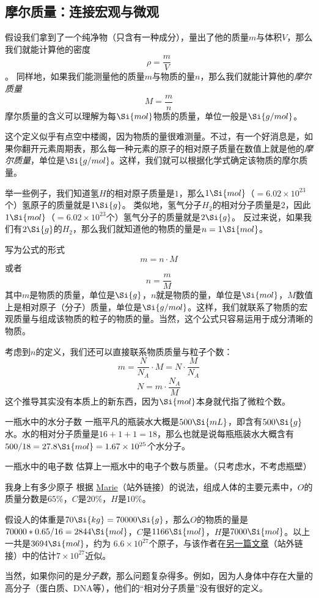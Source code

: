 \subsection{摩尔质量：连接宏观与微观}
假设我们拿到了一个纯净物（只含有一种成分），量出了他的质量$m$与体积$V$，那么我们就能计算他的密度
$$\rho = \frac{m}{V}$$。
同样地，如果我们能测量他的质量$m$与物质的量$n$，那么我们就能计算他的\textsl{摩尔质量}
$$M = \frac{m}{n}$$
摩尔质量的含义可以理解为每$\Si{mol}$物质的质量，单位一般是$\Si{g/mol}$。

这个定义似乎有点空中楼阁，因为物质的量很难测量。不过，有一个好消息是，如果你翻开元素周期表，那么每一种元素的原子的相对原子质量在数值上就是他的\textsl{摩尔质量}，单位是$\Si{g/mol}$。这样，我们就可以根据化学式确定该物质的摩尔质量。

举一些例子，我们知道氢$H$的相对原子质量是$1$，那么$1 \Si{mol}$（$=6.02\times 10^{23}$个）氢原子的质量就是$1 \Si{g}$。
类似地，氢气分子$H_2$的相对分子质量是$2$，因此$1 \Si{mol}$（$=6.02\times 10^{23}$个）氢气分子的质量就是$2 \Si{g}$。
反过来说，如果我们有$2 \Si{g}$的$H_2$，那么我们就知道他的物质的量是$n=1 \Si{mol}$。

写为公式的形式
$$m = n \cdot M$$
或者
$$n = \frac{m}{M}$$
其中$m$是物质的质量，单位是$\Si{g}$，$n$就是物质的量，单位是$\Si{mol}$，$M$数值上是相对原子（分子）质量，单位是$\Si{g/mol}$。这样，我们就联系了物质的宏观质量与组成该物质的粒子的物质的量。当然，这个公式只容易运用于成分清晰的物质。

考虑到$n$的定义，我们还可以直接联系物质质量与粒子个数：
$$m = \frac{N}{N_A} \cdot M = N \cdot \frac{M}{N_A}$$
$$N = m \cdot \frac{N_A}{M}$$
这个推导其实没有本质上的新东西，因为$\Si{mol}$本身就代指了微粒个数。

\begin{example}{一瓶水中的水分子数}
一瓶平凡的瓶装水大概是$500 \Si{mL}$，即含有$500 \Si{g}$水。水的相对分子质量是$16+1+1=18$，那么也就是说每瓶瓶装水大概含有$500/18=27.8 \Si{mol} = 1.67 \times 10^{25}$个水分子。
\end{example}

\begin{exercise}{一瓶水中的电子数}
估算上一瓶水中的电子个数与质量。（只考虑水，不考虑瓶壁）
\end{exercise}

\begin{example}{我身上有多少原子}
根据 \href{https://www.thoughtco.com/elemental-composition-of-human-body-603896}{Marie}（站外链接）的说法，组成人体的主要元素中，$O$的质量分数是$65\%$，$C$是$20\%$，$H$是$10\%$。

假设人的体重是$70 \Si{kg} = 70 000\Si{g}$，那么$O$的物质的量是$70000*0.65/16 = 2844 \Si{mol}$，$C$是$ 1166 \Si{mol}$，$H$是$ 7000 \Si{mol}$。以上一共是$3694 \Si{mol}$，约为 $6.6\times10^{27}$个原子，与该作者在\href{https://www.thoughtco.com/how-many-atoms-are-in-human-body-603872}{另一篇文章}（站外链接）中的估计$7\times10^{27}$近似。

当然，如果你问的是\textsl{分子数}，那么问题复杂得多。例如，因为人身体中存在大量的高分子（蛋白质、DNA等），他们的“相对分子质量”没有很好的定义。
\end{example}

